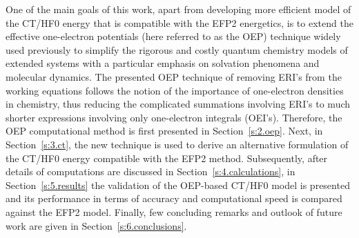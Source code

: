 One of the main goals of this work, apart from developing
more efficient model of the CT/HF0 energy that
is compatible with the EFP2 energetics, is to
extend the effective one\hyp{}electron potentials (here referred to as the OEP) 
technique
widely
used previously\cite{Roothaan.RevModPhys.1951,
Hohenberg.Kohn.PhysRev.1964,
Kohn.Sham.PhysRev.1965,
Otto.Ladik.ChemPhys.1975,
Holas.March.PhysRevA.1991,
Weber.Thiel.TCA.2000,
Neese.JCP.2005,
Cisneros.Andres.Piquemal.Darden.JCP.2005,
Piquemal.Cisneros.Reinhardt.Gresh.Darden.JCP.2006,
Li.Gordon.Jensen.JCP.2006,
Blasiak.Lee.Cho.JCP.2013,
Blasiak.Maj.Cho.Gora.JCTC.2015}
to simplify the rigorous and costly quantum chemistry models of extended systems
with a particular emphasis on solvation phenomena and molecular dynamics.
The presented OEP technique of removing ERI's from the working
equations
follows the notion of the importance of 
one\hyp{}electron densities in chemistry\cite{Kohn.Sham.PhysRev.1965,Holas.March.PhysRevA.1991},
thus reducing the complicated summations involving ERI's to much shorter expressions involving
only one\hyp{}electron integrals (OEI's).
Therefore, the OEP computational method is first presented in Section~\ref{s:2.oep}.
Next, in Section~\ref{s:3.ct},
the new technique is used to derive an alternative formulation of the CT/HF0 energy
compatible with the EFP2 method. Subsequently, after details of computations
are discussed in Section~\ref{s:4.calculations}, in Section~\ref{s:5.results} the validation of the 
OEP\hyp{}based CT/HF0 model is presented and its performance in terms 
of accuracy and computational speed is compared against the EFP2
model. Finally, few concluding remarks and outlook of future work
are given in Section~\ref{s:6.conclusions}.
%


